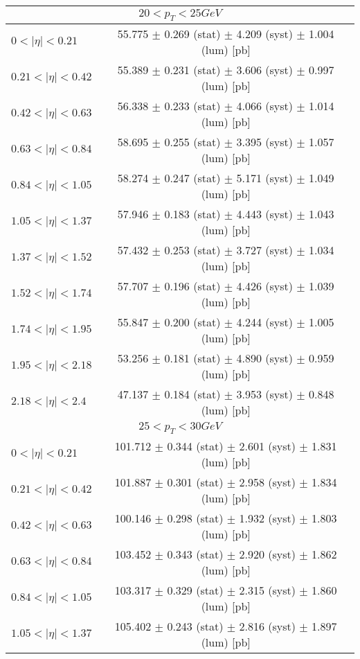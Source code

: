 \begin{tabular}{lc}
\hline
\multicolumn{2}{c}{$20 < p_{T} < 25 GeV$} \\
\hline
$0 < |\eta| <0.21$             & 55.775 $\pm$ 0.269 (stat) $\pm$ 4.209 (syst) $\pm$ 1.004 (lum) [pb]  \\
$0.21 < |\eta| <0.42$          & 55.389 $\pm$ 0.231 (stat) $\pm$ 3.606 (syst) $\pm$ 0.997 (lum) [pb]  \\
$0.42 < |\eta| <0.63$          & 56.338 $\pm$ 0.233 (stat) $\pm$ 4.066 (syst) $\pm$ 1.014 (lum) [pb]  \\
$0.63 < |\eta| <0.84$          & 58.695 $\pm$ 0.255 (stat) $\pm$ 3.395 (syst) $\pm$ 1.057 (lum) [pb]  \\
$0.84 < |\eta| <1.05$          & 58.274 $\pm$ 0.247 (stat) $\pm$ 5.171 (syst) $\pm$ 1.049 (lum) [pb]  \\
$1.05 < |\eta| <1.37$          & 57.946 $\pm$ 0.183 (stat) $\pm$ 4.443 (syst) $\pm$ 1.043 (lum) [pb]  \\
$1.37 < |\eta| <1.52$          & 57.432 $\pm$ 0.253 (stat) $\pm$ 3.727 (syst) $\pm$ 1.034 (lum) [pb]  \\
$1.52 < |\eta| <1.74$          & 57.707 $\pm$ 0.196 (stat) $\pm$ 4.426 (syst) $\pm$ 1.039 (lum) [pb]  \\
$1.74 < |\eta| <1.95$          & 55.847 $\pm$ 0.200 (stat) $\pm$ 4.244 (syst) $\pm$ 1.005 (lum) [pb]  \\
$1.95 < |\eta| <2.18$          & 53.256 $\pm$ 0.181 (stat) $\pm$ 4.890 (syst) $\pm$ 0.959 (lum) [pb]  \\
$2.18 < |\eta| <2.4$           & 47.137 $\pm$ 0.184 (stat) $\pm$ 3.953 (syst) $\pm$ 0.848 (lum) [pb]  \\
\hline
\multicolumn{2}{c}{$25 < p_{T} < 30 GeV$} \\
\hline
$0 < |\eta| <0.21$             & 101.712 $\pm$ 0.344 (stat) $\pm$ 2.601 (syst) $\pm$ 1.831 (lum) [pb]  \\
$0.21 < |\eta| <0.42$          & 101.887 $\pm$ 0.301 (stat) $\pm$ 2.958 (syst) $\pm$ 1.834 (lum) [pb]  \\
$0.42 < |\eta| <0.63$          & 100.146 $\pm$ 0.298 (stat) $\pm$ 1.932 (syst) $\pm$ 1.803 (lum) [pb]  \\
$0.63 < |\eta| <0.84$          & 103.452 $\pm$ 0.343 (stat) $\pm$ 2.920 (syst) $\pm$ 1.862 (lum) [pb]  \\
$0.84 < |\eta| <1.05$          & 103.317 $\pm$ 0.329 (stat) $\pm$ 2.315 (syst) $\pm$ 1.860 (lum) [pb]  \\
$1.05 < |\eta| <1.37$          & 105.402 $\pm$ 0.243 (stat) $\pm$ 2.816 (syst) $\pm$ 1.897 (lum) [pb]  \\

\end{tabular}
